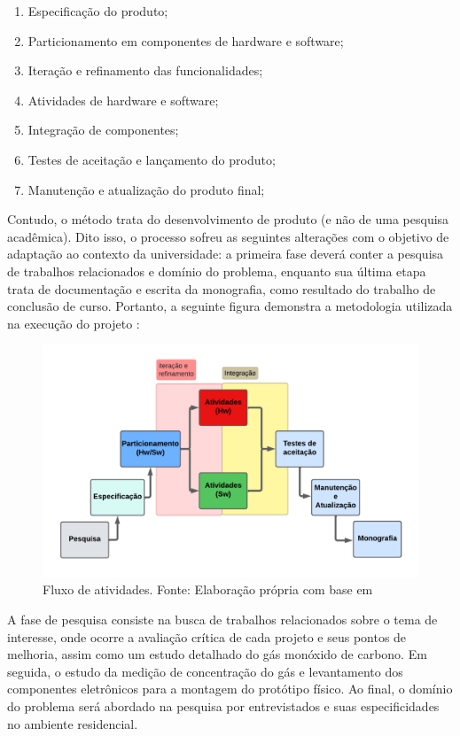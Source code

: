 \begin{enumerate}
    \item Especificação do produto;
    \item Particionamento em componentes de hardware e software;
    \item Iteração e refinamento das funcionalidades;
    \item Atividades de hardware e software;
    \item Integração de componentes;
    \item Testes de aceitação e lançamento do produto;
    \item Manutenção e atualização do produto final;
\end{enumerate}

Contudo, o método trata do desenvolvimento de produto (e não de uma pesquisa acadêmica). Dito isso, o processo sofreu as seguintes alterações com o objetivo de adaptação ao contexto da universidade: a primeira fase deverá conter a pesquisa de trabalhos relacionados e domínio do problema, enquanto sua última etapa trata de documentação e escrita da monografia, como resultado do trabalho de conclusão de curso. Portanto, a seguinte figura demonstra a metodologia utilizada na execução do projeto : 


\begin{figure}[ht]
\centering
\includegraphics[width=.75\textwidth]{img/diagrama-metodologia.png}
\caption{Fluxo de atividades. Fonte: Elaboração própria com base  em\cite{system-design-IOT}}\label{figMetodologia}
\end{figure}

A fase de pesquisa consiste na busca de trabalhos relacionados sobre o tema de interesse, onde ocorre a avaliação crítica de cada projeto e seus pontos de melhoria, assim como um estudo detalhado do gás monóxido de carbono. Em seguida, o estudo da medição de concentração do gás e levantamento dos componentes eletrônicos para a montagem do protótipo físico. Ao final, o domínio do problema será abordado na pesquisa por entrevistados e suas especificidades no ambiente residencial. 

